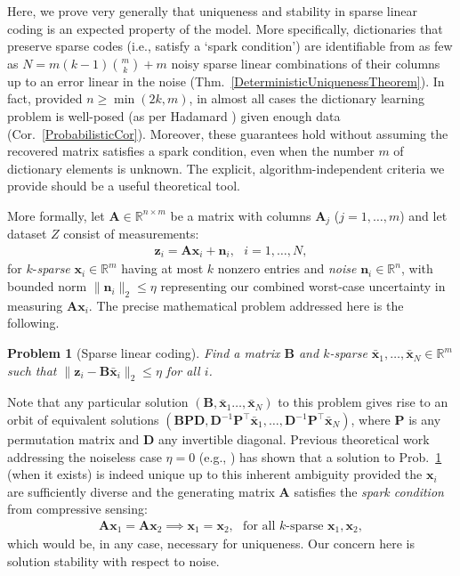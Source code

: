 \documentclass[9pt,twocolumn]{pnas-new}
\newtheorem{problem}{Problem}
\begin{document}
Here, we prove very generally that uniqueness and stability in sparse linear coding is an expected property of the model. 
More specifically, dictionaries that preserve sparse codes (i.e., satisfy a `spark condition') are identifiable from as few as \mbox{$N = m(k-1){m \choose k} + m$} noisy sparse linear combinations of their columns up to an error linear in the noise (Thm.~\ref{DeterministicUniquenessTheorem}). In fact, provided $n \geq \min(2k,m)$, in almost all cases the dictionary learning problem is well-posed (as per Hadamard \cite{Hadamard1902}) given enough data (Cor.~\ref{ProbabilisticCor}). Moreover, these guarantees hold without assuming the recovered matrix satisfies a spark condition, even when the number $m$ of dictionary elements is unknown. The explicit, algorithm-independent criteria we provide should be a useful theoretical tool.  %

More formally, let $\mathbf{A} \in \mathbb R^{n \times m}$ be a matrix with columns $\mathbf{A}_j$ ($j = 1,\ldots,m$) and let dataset $Z$ consist of measurements:
\begin{align}\label{LinearModel}
\mathbf{z}_i = \mathbf{A}\mathbf{x}_i + \mathbf{n}_i,\ \ \  \text{$i=1,\ldots,N$},
\end{align}
for $k$-\emph{sparse} $\mathbf{x}_i \in \mathbb{R}^m$ having at most $k$ nonzero entries and \emph{noise} $\mathbf{n}_i \in \mathbb{R}^n$, with bounded norm $\| \mathbf{n}_i \|_2 \leq  \eta$ representing our combined worst-case uncertainty in  measuring $\mathbf{A}\mathbf{x}_i$.
The precise mathematical problem addressed here is the following.

\begin{problem}[Sparse linear coding]\label{InverseProblem}
Find a matrix $\mathbf{B}$ and $k$-sparse $\mathbf{\bar x}_1, \ldots, \mathbf{\bar x}_N \in \mathbb{R}^m$ such that $\|\mathbf{z}_i - \mathbf{B}\mathbf{\bar x}_i\|_2 \leq \eta$ for all $i$.
\end{problem}

Note that any particular solution $(\mathbf{B}, \mathbf{\bar x}_1 \ldots, \mathbf{\bar x}_N)$ to this problem gives rise to an orbit of equivalent solutions $(\mathbf{BPD}, \mathbf{D}^{-1}\mathbf{P}^{\top}\mathbf{\bar x}_1, \ldots, \mathbf{D}^{-1}\mathbf{P}^{\top}\mathbf{\bar x}_N)$, where $\mathbf{P}$ is any permutation matrix and $\mathbf{D}$ any invertible diagonal. Previous theoretical work addressing the noiseless case $\eta =0$ (e.g., \cite{li2004analysis, Georgiev05, Aharon06, Hillar15}) has shown that a solution to Prob.~\ref{InverseProblem} (when it exists) is indeed unique up to this inherent ambiguity provided the $\mathbf{x}_i$ are sufficiently diverse and the generating matrix $\mathbf{A}$ satisfies the \textit{spark condition} from compressive sensing:
\begin{align}\label{SparkCondition}
\mathbf{A}\mathbf{x}_1 = \mathbf{A}\mathbf{x}_2 \implies \mathbf{x}_1 = \mathbf{x}_2, \ \ \ \text{for all $k$-sparse } \mathbf{x}_1, \mathbf{x}_2,
\end{align}
%
which would be, in any case, necessary for uniqueness. Our concern here is solution stability with respect to noise.
\end{document}
